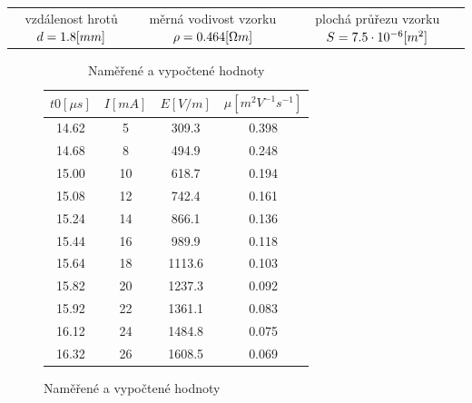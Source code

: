\documentclass{article}
\begin{document}
\newpage
\hspace{-8mm}
\begin{tabular}{ccc}
    vzdálenost hrotů \(d = 1.8\-[mm]\) & měrná vodivost vzorku \(\rho = 0.464\-[\Omega m]\) & plochá průřezu vzorku \(S = 7.5\cdot10^{-6}\-[m^2]\) \\
\end{tabular}
\vspace{-5mm}
\begin{figure}[H]
    \begin{minipage}[t]{0.5\textwidth}
        \vspace{-100mm}
        \hspace{0.1\textwidth}
        \begin{table}[H]
            \centering
            \caption{\label{tabulka_mereni} Naměřené a vypočtené hodnoty}
            \begin{tabular}{|c|c|c|c|}
                \hline
                \(t0 [\mu s]\)	& \(I [mA]\)	& \(E [V/m]\)   & \(\mu [m^2V^{-1}s^{-1}]\) \\ \hline
                14.62	        &  5	        &  309.3        & 0.398                     \\ \hline
                14.68	        &  8	        &  494.9        & 0.248                     \\ \hline
                15.00	        & 10	        &  618.7        & 0.194                     \\ \hline
                15.08	        & 12	        &  742.4        & 0.161                     \\ \hline
                15.24	        & 14	        &  866.1        & 0.136                     \\ \hline
                15.44	        & 16	        &  989.9        & 0.118                     \\ \hline
                15.64	        & 18	        & 1113.6        & 0.103                     \\ \hline
                15.82	        & 20	        & 1237.3        & 0.092                     \\ \hline
                15.92	        & 22	        & 1361.1        & 0.083                     \\ \hline
                16.12	        & 24	        & 1484.8        & 0.075                     \\ \hline
                16.32	        & 26	        & 1608.5        & 0.069                     \\ \hline

\end{tabular}
\end{table}
\end{minipage}
\end{figure}
\end{document}
